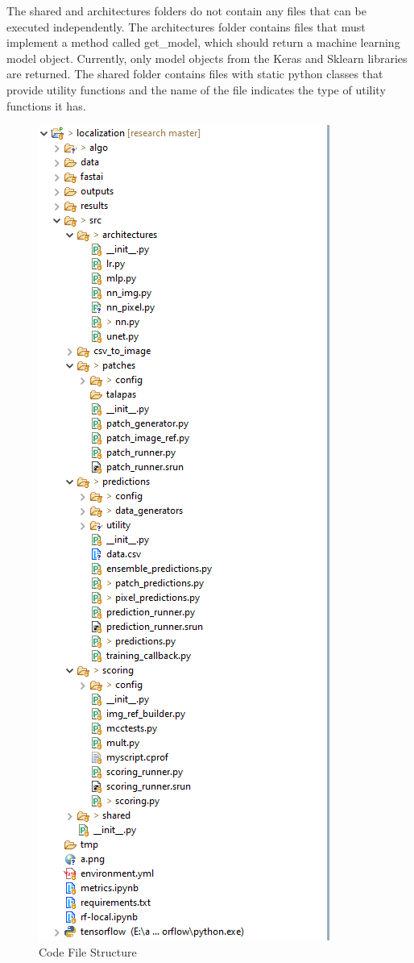 The shared and architectures folders do not contain any files that can be executed independently. The architectures folder contains files
that must implement a method called get\_model, which should return a machine learning model object. Currently, only model objects from
the Keras and Sklearn libraries are returned. The shared folder contains files with static python classes that provide utility functions
and the name of the file indicates the type of utility functions it has.

\begin{figure}
    \centering
    \includegraphics[width=\textwidth, height=0.9\textheight]
        {figures/code_file_structure.png}
    \caption{Code File Structure}
    \label{fig:code_file_structure}
\end{figure}
